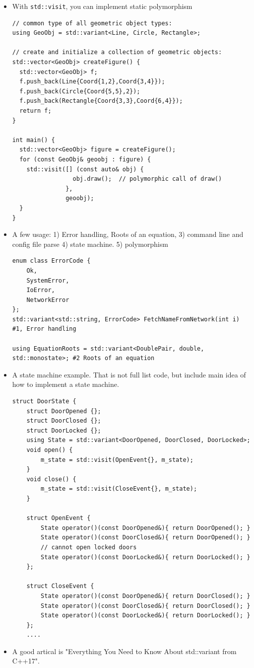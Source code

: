 \documentclass[a4paper,11pt,twoside]{book}
\begin{document}
\begin{itemize}
\item With \texttt{std::visit}, you can implement static polymorphism

\begin{lstlisting}
// common type of all geometric object types:
using GeoObj = std::variant<Line, Circle, Rectangle>;
  
// create and initialize a collection of geometric objects:
std::vector<GeoObj> createFigure() {
  std::vector<GeoObj> f;
  f.push_back(Line{Coord{1,2},Coord{3,4}});
  f.push_back(Circle{Coord{5,5},2});  
  f.push_back(Rectangle{Coord{3,3},Coord{6,4}});  
  return f;
}

int main() {
  std::vector<GeoObj> figure = createFigure();
  for (const GeoObj& geoobj : figure) {
    std::visit([] (const auto& obj) {
                 obj.draw();  // polymorphic call of draw()
               },
               geoobj);
  }
}
\end{lstlisting}

\item A few usage: 1) Error handling, Roots of an equation, 3) command line and config file parse 4) state machine. 5) polymorphism
    
\begin{lstlisting}
enum class ErrorCode {
    Ok,
    SystemError,
    IoError,
    NetworkError
};
std::variant<std::string, ErrorCode> FetchNameFromNetwork(int i) #1, Error handling

using EquationRoots = std::variant<DoublePair, double, std::monostate>; #2 Roots of an equation
\end{lstlisting}

\item A state machine example. That is not full list code, but include main idea of how to implement a state machine.
\begin{lstlisting}
struct DoorState {
    struct DoorOpened {};
    struct DoorClosed {};
    struct DoorLocked {};
    using State = std::variant<DoorOpened, DoorClosed, DoorLocked>;
    void open() {
        m_state = std::visit(OpenEvent{}, m_state);
    }
    void close() {
        m_state = std::visit(CloseEvent{}, m_state);
    }

    struct OpenEvent {
        State operator()(const DoorOpened&){ return DoorOpened(); }
        State operator()(const DoorClosed&){ return DoorOpened(); }
        // cannot open locked doors
        State operator()(const DoorLocked&){ return DoorLocked(); } 
    };

    struct CloseEvent {
        State operator()(const DoorOpened&){ return DoorClosed(); }
        State operator()(const DoorClosed&){ return DoorClosed(); }
        State operator()(const DoorLocked&){ return DoorLocked(); }
    };
    ....
\end{lstlisting}

\item A good artical is "Everything You Need to Know About std::variant from C++17".

\end{itemize}
\end{document}
